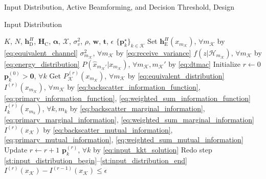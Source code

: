 \documentclass[journal]{IEEEtran}
\begin{document}
\begin{section}{Input Distribution, Active Beamforming, and Decision Threshold, Design}
\begin{subsection}{Input Distribution}
		\begin{algorithm}[!t]
			\caption{Numerical Evaluation of \gls{kkt} Input Distribution}
			\label{al:input_distribution}
			\begin{algorithmic}[1]
				\Require $K$, $N$, $\boldsymbol{h}_{\mathrm{D}}^H$, $\boldsymbol{H}_{\mathrm{C}}$, $\boldsymbol{\alpha}$, $\mathcal{X}$, $\sigma_v^2$, $\rho$, $\boldsymbol{w}$, $\boldsymbol{t}$, $\epsilon$
				\Ensure $\{\boldsymbol{p}_k^\star\}_{k \in \mathcal{K}}$
				\State Set $\boldsymbol{h}_{\mathrm{E}}^H(x_{m_{\mathcal{K}}})$, $\forall m_{\mathcal{K}}$ by \eqref{eq:equivalent_channel}
				\State \phantom{Set} $\sigma^2_{m_{\mathcal{K}}}$, $\forall m_{\mathcal{K}}$ by \eqref{eq:receive_variance}
				\State \phantom{Set} $f(z|\mathcal{H}_{m_{\mathcal{K}}})$, $\forall m_{\mathcal{K}}$ by \eqref{eq:energy_distribution}
				\State \phantom{Set} $P(\hat{x}_{m_{\mathcal{K}}'}|x_{m_{\mathcal{K}}})$, $\forall m_{\mathcal{K}}, m_{\mathcal{K}}'$ by \eqref{eq:dtmac}
				\State Initialize $r \gets 0$
				\State \phantom{Initialize} $\boldsymbol{p}_k^{(0)} > \boldsymbol{0}$, $\forall k$
				\State Get $P_{\mathcal{K}}^{(r)}(x_{m_{\mathcal{K}}})$, $\forall m_{\mathcal{K}}$ by \eqref{eq:equivalent_distribution} \label{st:input_distribution_begin}
				\State \phantom{Get} $I^{(r)}(x_{m_{\mathcal{K}}})$, $\forall m_{\mathcal{K}}$ by \eqref{eq:backscatter_information_function}, \eqref{eq:primary_information_function}, \eqref{eq:weighted_sum_information_function}
				\State \phantom{Get} $I^{(r)}_k(x_{m_k})$, $\forall k,m_k$ by \eqref{eq:backscatter_marginal_information}, \eqref{eq:primary_marginal_information}, \eqref{eq:weighted_sum_marginal_information}
				\State \phantom{Get} $I^{(r)}(x_{\mathcal{K}})$ by \eqref{eq:backscatter_mutual_information}, \eqref{eq:primary_mutual_information}, \eqref{eq:weighted_sum_mutual_information} \label{st:input_distribution_end}
				\Repeat
					\State Update $r \gets r+1$
					\State \phantom{Update} $\boldsymbol{p}_k^{(r)}$, $\forall k$ by \eqref{eq:input_kkt_solution}
					\State Redo step \ref{st:input_distribution_begin}--\ref{st:input_distribution_end}
				\Until $I^{(r)}(x_{\mathcal{K}}) - I^{(r-1)}(x_{\mathcal{K}}) \le \epsilon$
			\end{algorithmic}
		\end{algorithm}
	\end{subsection}


\end{section}
\end{document}
